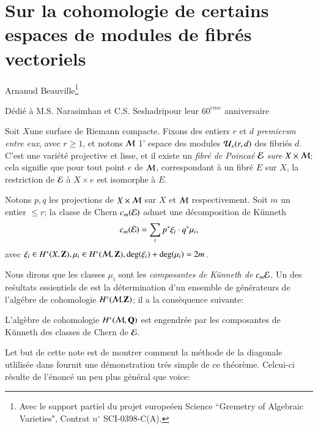\chapter{Sur la cohomologie de certains espaces de modules de fibr\'es vectoriels}\label{chap3}


\begin{center}
{\large Arnanud Beauville}\footnote{Avec le support partiel du projet europe\'een Science ``Gremetry of Algebraic Varieties", Contrat $n^{\circ}$ SCI-0398-C(A).}

\medskip
D\'edi\'e \`a M.S. Narasimhan et C.S. Seshadri\break pour leur $60^{{\grave{e}}me}$ anniversaire
\end{center}

Soit $X$\pageoriginale une surface de Riemann compacte. Fixons des entiers $r$ et $d$ \textit{premiersm entre eux}, avec $r\geq 1$, et notons $\mathcal{M}$ 1' espace des modules $\mathcal{U}_{x}(r,d)$ des fibri\'es $d$. C'est une vari\'et\'e projective et lisse, et il existe un \textit{fibr\'e de Poinca\'e $\bf\mathcal{E}$ sure $X \times \mathcal{M}$}; cela signifie que pour tout point $e$ de $\mathcal{M}$, correspondant \`a un fibr\'e $E$ sur $X$, la restriction de $\mathcal{E}$ \`a $X \times{e}$ est isomorphe \`a $E$.  

Notons $p,q$ les projections de $X \times \mathcal{M}$ sur $X$ et $\mathcal{M}$ respectivement. Soit $m$ un entier $\leq r$; la 
classe de Chern $c_{m}(\mathcal{E})$ admet une d\'ecomposition de K\"unneth
$$
c_{m}(\mathcal{E}) = \sum\limits_{i}p^{*}\xi_{i} \cdot q^{*} \mu_{i}, 
$$
avec $\xi_{i} \in H ^{*}(X, \mathbf{Z}), \mu_{i} \in H^{*}(\mathcal{M}, \mathbf{Z}),\deg(\xi_{i}) + \deg(\mu_{i}) =2m$. 

Nous dirons que les classes $\mu_{i}$ sont les \textit{composantes de K\"unneth de $c_{m}{\mathcal{E}}$}. Un des re\'sultats essientiels de \cite{chap3-keyA-B} est la d\'etermination d'un ensemble de g\'en\'erateurs de l'alg\'ebre de cohomologie $H^{*}(\mathcal{M}. \mathbf{Z})$; il a la cons\`equence suivante:

\begin{theoreme*}
L'alg\`ebre de cohomologie $H^{*} (\mathcal{M}, \mathbf{Q})$ est engendr\'ee par les composantes de K\"unneth des classes de Chern de ${\mathcal{E}}$. 
\end{theoreme*}

Let but de cette note est de montrer comment la m\'ethode de la diagonale utlilis\'ee dans \cite{chap3-keyE-S} fournit une d\'emonstration tr\'es simple de ce th\'eor\`eme. Celcui-ci r\'esulte de l'\'enonc\'e un peu plus g\'en\'eral que voice:

